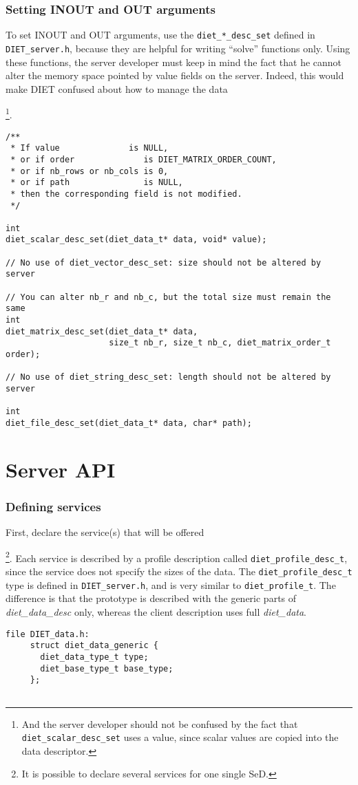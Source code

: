 \subsubsection*{Setting INOUT and OUT arguments}

To set INOUT and OUT arguments, use the \texttt{diet\_*\_desc\_set} defined
in \texttt{DIET\_server.h}, because they are helpful for writing ``solve''
functions only. Using these functions, the server developer must keep in
mind the fact that he cannot alter the memory space pointed by value fields
on the server. Indeed, this would make DIET confused about how to manage
the data{\footnote{And the server developer should not be confused by the
    fact that \texttt{diet\_scalar\_desc\_set} uses a value, since scalar
    values are copied into the data descriptor.}.

{\footnotesize
\begin{verbatim}
/**
 * If value              is NULL,
 * or if order              is DIET_MATRIX_ORDER_COUNT,
 * or if nb_rows or nb_cols is 0,
 * or if path               is NULL,
 * then the corresponding field is not modified.
 */

int
diet_scalar_desc_set(diet_data_t* data, void* value);

// No use of diet_vector_desc_set: size should not be altered by server

// You can alter nb_r and nb_c, but the total size must remain the same
int
diet_matrix_desc_set(diet_data_t* data,
                     size_t nb_r, size_t nb_c, diet_matrix_order_t order);

// No use of diet_string_desc_set: length should not be altered by server

int
diet_file_desc_set(diet_data_t* data, char* path);
\end{verbatim}
}


\section{Server API}
\label{sec:svAPI}


\subsubsection*{Defining services}

First, declare the service(s) that will be offered{\footnote{It is possible to
  declare several services for one single SeD.}.
Each service is described by a profile description called \texttt{diet\_profile\_desc\_t}, since the service does not specify the sizes of the data.
The \texttt{diet\_profile\_desc\_t} type is defined in \texttt{DIET\_server.h},
and is very similar to \texttt{diet\_profile\_t}. The difference is that the
prototype is described with the generic parts of \emph{diet\_data\_desc} only,
whereas the client description uses full \emph{diet\_data}.
{\footnotesize
\begin{verbatim}
file DIET_data.h:
     struct diet_data_generic {
       diet_data_type_t type;
       diet_base_type_t base_type;
     };


\end{verbatim}}}}
